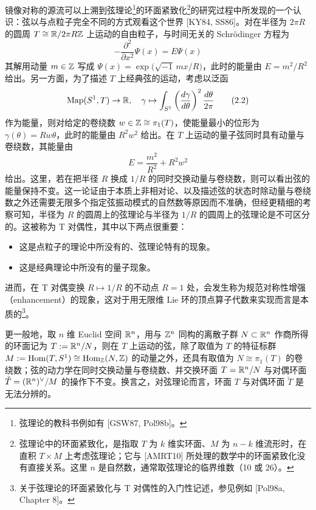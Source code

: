 镜像对称的源流可以上溯到弦理论\footnote{弦理论的教科书例如有 [GSW87, Pol98b]。}的环面紧致化\footnote{弦理论中的环面紧致化，是指取 $T$ 为 $k$ 维实环面、$M$ 为 $n-k$ 维流形时，在直积 $T\times M$ 上考虑弦理论；它与 [AMRT10] 所处理的数学中的环面紧致化没有直接关系。这里 $n$ 是自然数，通常取弦理论的临界维数（10 或 26）。}的研究过程中所发现的一个认识：弦以与点粒子完全不同的方式观看这个世界 [KY84, SS86]。对在半径为 $2\pi R$ 的圆周 $T\cong\mathbb{R}/2\pi R\mathbb{Z}$ 上运动的自由粒子，与时间无关的 Schrödinger 方程为
\begin{equation}
    -\frac{\partial^2}{\partial x^2}\Psi(x) = E \Psi(x) \tag{2.1}
\end{equation}
其解用动量 $m\in\mathbb{Z}$ 写成 $\Psi(x)=\exp\bigl(\sqrt{-1}\,mx/R\bigr)$，此时的能量由 $E=m^2/R^2$ 给出。另一方面，为了描述 $T$ 上经典弦的运动，考虑以泛函
\begin{equation}
    \operatorname{Map}(S^1,T)\to\mathbb{R},\quad
    \gamma\mapsto\int_{S^1}\left(\frac{d\gamma}{d\theta}\right)^2\frac{d\theta}{2\pi} \tag{2.2}
\end{equation}
作为能量，则对给定的卷绕数 $w\in\mathbb{Z}\cong\pi_1(T)$，使能量最小的位形为 $\gamma(\theta)=Rw\theta$，此时的能量由 $R^2w^2$ 给出。在 $T$ 上运动的量子弦同时具有动量与卷绕数，其能量由
\begin{equation}
    E=\frac{m^2}{R^2}+R^2w^2 \tag{2.3}
\end{equation}
给出。这里，若在把半径 $R$ 换成 $1/R$ 的同时交换动量与卷绕数，则可以看出弦的能量保持不变。这一论证由于本质上非相对论、以及描述弦的状态时除动量与卷绕数之外还需要无限多个指定弦振动模式的自然数等原因而不准确，但经更精细的考察可知，半径为 $R$ 的圆周上的弦理论与半径为 $1/R$ 的圆周上的弦理论是不可区分的。这被称为 T 对偶性，其中以下两点很重要：

\begin{itemize}
    \item 这是点粒子的理论中所没有的、弦理论特有的现象。
    \item 这是经典理论中所没有的量子现象。
\end{itemize}

进而，在 T 对偶变换 $R\mapsto1/R$ 的不动点 $R=1$ 处，会发生称为规范对称性增强（enhancement）的现象，这对于用无限维 Lie 环的顶点算子代数来实现而言是本质的\footnote{关于弦理论的环面紧致化与 T 对偶性的入门性记述，参见例如 [Pol98a, Chapter 8]。}。

更一般地，取 $n$ 维 Euclid 空间 $\mathbb{R}^n$，用与 $\mathbb{Z}^n$ 同构的离散子群 $N\subset\mathbb{R}^n$ 作商所得的环面记为 $T:=\mathbb{R}^n/N$，则在 $T$ 上运动的弦，除了取值为 $T$ 的特征标群 $M:=\operatorname{Hom}(T,S^1)\cong\operatorname{Hom}_{\mathbb{Z}}(N,\mathbb{Z})$ 的动量之外，还具有取值为 $N\cong\pi_1(T)$ 的卷绕数；弦的动力学在同时交换动量与卷绕数、并交换环面 $T=\mathbb{R}^n/N$ 与对偶环面 $\check{T}=(\mathbb{R}^n)^{\vee}/M$ 的操作下不变。换言之，对弦理论而言，环面 $T$ 与对偶环面 $\check{T}$ 是无法分辨的。

